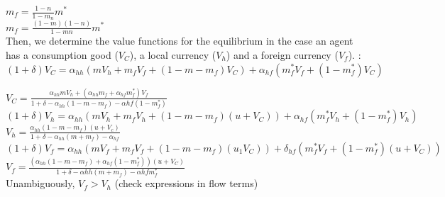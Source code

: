 $m _ { f } = \frac { 1 - n } { 1 - m _ { n } } m^*$\\

$m_ { f } = \frac { ( 1 - m ) ( 1 - n ) } { 1 - m n }m^* $\\

Then, we determine the value functions for the equilibrium in the case an agent has a consumption good ($V_C$), a local currency ($V_h$) and a foreign currency ($V_f$). :\\

$(1+\delta)V_C=\alpha _ { h h }(m V _ { h } +m_fV_f+(1-m-m_f)V_C)+ \alpha_{hf}(m_f^*V_f+(1-m_f^*)V_C)           $

$V _ { C } = \frac { \alpha _ { h h } m V _ { h } + \left( \alpha _ { h h } m _ { f } + \alpha _ { h f } m _ { f } ^ { * } \right) V _ { f } } { 1 + \delta - \alpha_{h h} \left( 1 - m - m _ { f } \right) - \alpha {h f } \left( 1 - m _ { f }^* \right) }$\\


$( 1 + \delta ) V_ h = \alpha_{hh} \left( m V _ { h } + m _ { f } V_h + \left( 1 - m - m _ { f } \right) ( u + V_C ) \right) + \alpha _ { hf } \left( m _ { f }^*  V _ { h } + \left( 1 - m _ { f } ^ { * } \right) V _ { h } \right) $\\



$V _ { h } = \frac { \alpha  _ { hh } \left( 1 - m - m _ { f } \right) \left( u + V _ { c } \right) } { 1 + \delta - \alpha_{h h} \left( m + m _ { f } \right) - \alpha  _ { hf } }$ \\





$( 1 + \delta ) V _ { f } = \alpha _ { h h } \left( m V _ { f } + m _ { f } V _ { f } + \left( 1 - m - m _ { f } \right) \left( u _ { 1 } V _ { C } \right) \right) + \delta_{hf} \left( m _ { f }^* V _ { f } + \left( 1 - m _ { f }^* \right) \left( u + V _ { C } \right) \right)$ \\



$V _ { f } = \frac { \left( \alpha _ { h h } \left( 1 -m- m _ { f } \right) + \alpha _ { h f } \left( 1 - m _ { f } ^*\right) \right) \left( u + V _ { C } \right) } { 1 + \delta - \alpha {h h} \left( m + m _ { f } \right) - \alpha {h f } m _ { f }^* }$\\

Unambiguously, $V_{f} > V _ { h }$ (check expressions in flow terms)\\

